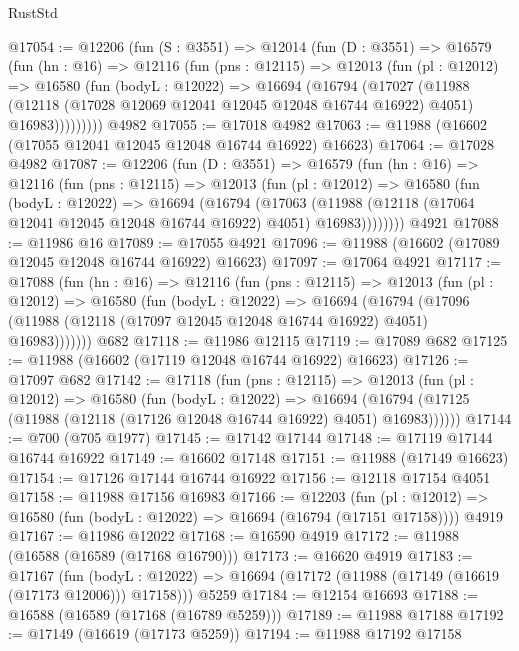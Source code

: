 \begin{lexlean}{RustStd}
\begin{coremodule}
@17054 := @12206
    (fun (S : @3551) =>
    @12014
      (fun (D : @3551) =>
      @16579
        (fun (hn : @16) =>
        @12116
          (fun (pns : @12115) =>
          @12013
            (fun (pl : @12012) =>
            @16580
              (fun (bodyL : @12022) =>
              @16694
                (@16794
                  (@17027
                    (@11988
                      (@12118 (@17028 @12069 @12041 @12045 @12048 @16744 @16922) @4051)
                      @16983)))))))))
    @4982
@17055 := @17018 @4982
@17063 := @11988 (@16602 (@17055 @12041 @12045 @12048 @16744 @16922) @16623)
@17064 := @17028 @4982
@17087 := @12206
    (fun (D : @3551) =>
    @16579
      (fun (hn : @16) =>
      @12116
        (fun (pns : @12115) =>
        @12013
          (fun (pl : @12012) =>
          @16580
            (fun (bodyL : @12022) =>
            @16694
              (@16794
                (@17063
                  (@11988 (@12118 (@17064 @12041 @12045 @12048 @16744 @16922) @4051) @16983))))))))
    @4921
@17088 := @11986 @16
@17089 := @17055 @4921
@17096 := @11988 (@16602 (@17089 @12045 @12048 @16744 @16922) @16623)
@17097 := @17064 @4921
@17117 := @17088
    (fun (hn : @16) =>
    @12116
      (fun (pns : @12115) =>
      @12013
        (fun (pl : @12012) =>
        @16580
          (fun (bodyL : @12022) =>
          @16694
            (@16794
              (@17096 (@11988 (@12118 (@17097 @12045 @12048 @16744 @16922) @4051) @16983)))))))
    @682
@17118 := @11986 @12115
@17119 := @17089 @682
@17125 := @11988 (@16602 (@17119 @12048 @16744 @16922) @16623)
@17126 := @17097 @682
@17142 := @17118
    (fun (pns : @12115) =>
    @12013
      (fun (pl : @12012) =>
      @16580
        (fun (bodyL : @12022) =>
        @16694 (@16794 (@17125 (@11988 (@12118 (@17126 @12048 @16744 @16922) @4051) @16983))))))
@17144 := @700 (@705 @1977)
@17145 := @17142 @17144
@17148 := @17119 @17144 @16744 @16922
@17149 := @16602 @17148
@17151 := @11988 (@17149 @16623)
@17154 := @17126 @17144 @16744 @16922
@17156 := @12118 @17154 @4051
@17158 := @11988 @17156 @16983
@17166 := @12203
    (fun (pl : @12012) => @16580 (fun (bodyL : @12022) => @16694 (@16794 (@17151 @17158))))
    @4919
@17167 := @11986 @12022
@17168 := @16590 @4919
@17172 := @11988 (@16588 (@16589 (@17168 @16790)))
@17173 := @16620 @4919
@17183 := @17167
    (fun (bodyL : @12022) => @16694 (@17172 (@11988 (@17149 (@16619 (@17173 @12006))) @17158)))
    @5259
@17184 := @12154 @16693
@17188 := @16588 (@16589 (@17168 (@16789 @5259)))
@17189 := @11988 @17188
@17192 := @17149 (@16619 (@17173 @5259))
@17194 := @11988 @17192 @17158

\end{coremodule}
\end{lexlean}
